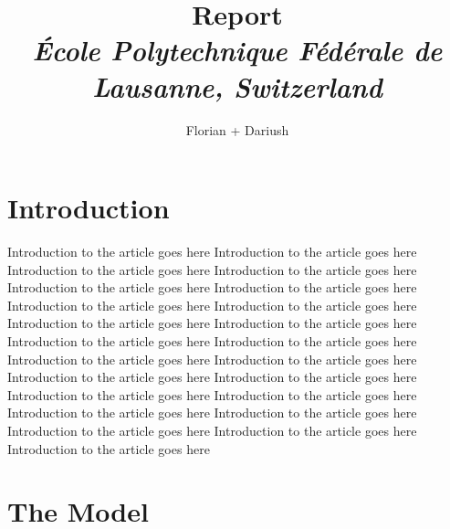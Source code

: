 \documentclass[10pt,a4paper,oneside,twocolumn]{article}
\numberwithin{equation}{section} %
\begin{document}
\title{\huge{\textbf{Report}}\\
	\vspace{0.5cm}
	\Large{\textit{\'Ecole Polytechnique F\'ed\'erale de Lausanne, Switzerland}}}
\author{\large{Florian + Dariush}}

\begin{titlepage}
 \maketitle
\thispagestyle{empty}
\end{titlepage}

\section{Introduction}
    Introduction to the article goes here    Introduction to the article goes here  Introduction to the article goes here  Introduction to the article goes here  Introduction to the article goes here  Introduction to the article goes here  Introduction to the article goes here  Introduction to the article goes here  Introduction to the article goes here  Introduction to the article goes here  Introduction to the article goes here  Introduction to the article goes here  Introduction to the article goes here  Introduction to the article goes here  Introduction to the article goes here  Introduction to the article goes here  Introduction to the article goes here  Introduction to the article goes here  Introduction to the article goes here  Introduction to the article goes here  Introduction to the article goes here  Introduction to the article goes here Introduction to the article goes here \\

\section{The Model}
\end{document}
